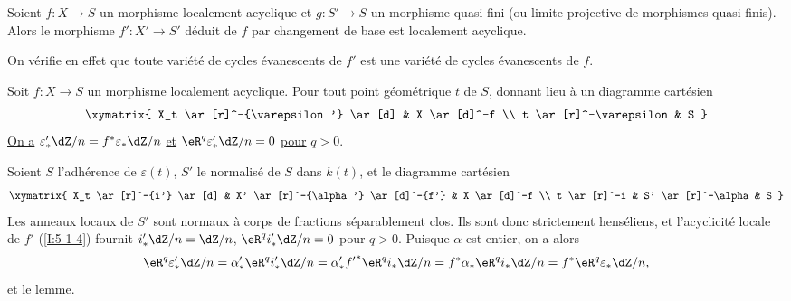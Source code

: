 \begin{lemmadotdash}\label{I:5-1-4}
Soient $f:X\to S$ un morphisme localement acyclique et $g:S'\to S$ un morphisme 
quasi-fini (ou limite projective de morphismes quasi-finis). Alors le 
morphisme $f':X'\to S'$ déduit de $f$ par changement de base est localement 
acyclique.
\end{lemmadotdash}

On vérifie en effet que toute variété de cycles évanescents de $f'$ est 
une variété de cycles évanescents de $f$.  	





\begin{sourcelemmabarenumber}\label{I:5-1-5}
Soit $f:X\to S$ un morphisme localement acyclique. Pour tout point géométrique 
$t$ de $S$, donnant lieu à un diagramme cartésien 
\[\xymatrix{
  X_t \ar[r]^-{\varepsilon'} \ar[d] 
    & X \ar[d]^-f \\
  t \ar[r]^-\varepsilon 
    & S
}\]
\underline{On a} $\varepsilon_*' \dZ/n = f^*\varepsilon_* \dZ/n$ \underline{et} $\eR^q \varepsilon_*'\dZ/n=0$ 
\underline{pour} $q>0$. 
\end{sourcelemmabarenumber}

Soient $\bar S$ l'adhérence de $\varepsilon(t)$, $S'$ le normalisé de $\bar S$ 
dans $k(t)$, et le diagramme cartésien 
\[\xymatrix{
  X_t \ar[r]^-{i'} \ar[d] 
    & X' \ar[r]^-{\alpha'} \ar[d]^-{f'} 
    & X \ar[d]^-f \\
  t \ar[r]^-i 
    & S' \ar[r]^-\alpha 
    & S
}\]
Les anneaux locaux de $S'$ sont normaux à corps de fractions séparablement 
clos. Ils sont donc strictement henséliens, et l'acyclicité locale de $f'$ 
(\ref{I:5-1-4}) fournit $i'_*\dZ/n = \dZ/n$, $\eR^q i'_*\dZ/n = 0$ pour $q>0$. 
Puisque $\alpha$ est entier, on a alors 
\[
  \eR^q\varepsilon_*'\dZ/n 
    = \alpha_*' \eR^q i_*' \dZ/n 
    = \alpha_*' {f'}^* \eR^q i_* \dZ/n 
    = f^* \alpha_* \eR^q i_* \dZ/n 
    = f^* \eR^q \varepsilon_* \dZ/n \text{,}
\]
et le lemme. 





